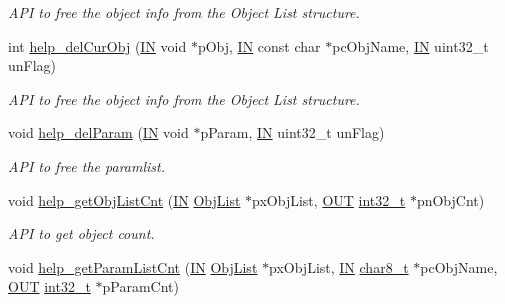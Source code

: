 \begin{DoxyCompactItemize}
\begin{DoxyCompactList}\small\item\em A\-P\-I to free the object info from the Object List structure. \end{DoxyCompactList}\item 
int \hyperlink{group__LIBHELP_ga44eabeb9342dfc93a4f4de134d43e8ea}{help\-\_\-del\-Cur\-Obj} (\hyperlink{group__LIBHELP_gac2bbd6d630a06a980d9a92ddb9a49928}{I\-N} void $\ast$p\-Obj, \hyperlink{group__LIBHELP_gac2bbd6d630a06a980d9a92ddb9a49928}{I\-N} const char $\ast$pc\-Obj\-Name, \hyperlink{group__LIBHELP_gac2bbd6d630a06a980d9a92ddb9a49928}{I\-N} uint32\-\_\-t un\-Flag)
\begin{DoxyCompactList}\small\item\em A\-P\-I to free the object info from the Object List structure. \end{DoxyCompactList}\item 
void \hyperlink{group__LIBHELP_ga6e97d803078dec87657f1a4558206d14}{help\-\_\-del\-Param} (\hyperlink{group__LIBHELP_gac2bbd6d630a06a980d9a92ddb9a49928}{I\-N} void $\ast$p\-Param, \hyperlink{group__LIBHELP_gac2bbd6d630a06a980d9a92ddb9a49928}{I\-N} uint32\-\_\-t un\-Flag)
\begin{DoxyCompactList}\small\item\em A\-P\-I to free the paramlist. \end{DoxyCompactList}\item 
void \hyperlink{group__LIBHELP_gafd93b1fc0a079d3dda8a3b55ec333644}{help\-\_\-get\-Obj\-List\-Cnt} (\hyperlink{group__LIBHELP_gac2bbd6d630a06a980d9a92ddb9a49928}{I\-N} \hyperlink{structObjList}{Obj\-List} $\ast$px\-Obj\-List, \hyperlink{group__LIBHELP_gaec78e7a9e90a406a56f859ee456e8eae}{O\-U\-T} \hyperlink{commondefs_8h_a32f2e37ee053cf2ce8ca28d1f74630e5}{int32\-\_\-t} $\ast$pn\-Obj\-Cnt)
\begin{DoxyCompactList}\small\item\em A\-P\-I to get object count. \end{DoxyCompactList}\item 
void \hyperlink{group__LIBHELP_ga0a5ee1490de2047bd9b7fbb32c8ef583}{help\-\_\-get\-Param\-List\-Cnt} (\hyperlink{group__LIBHELP_gac2bbd6d630a06a980d9a92ddb9a49928}{I\-N} \hyperlink{structObjList}{Obj\-List} $\ast$px\-Obj\-List, \hyperlink{group__LIBHELP_gac2bbd6d630a06a980d9a92ddb9a49928}{I\-N} \hyperlink{group__LIBHELP_ga054e39e306fb3948d07aadf394da2fbf}{char8\-\_\-t} $\ast$pc\-Obj\-Name, \hyperlink{group__LIBHELP_gaec78e7a9e90a406a56f859ee456e8eae}{O\-U\-T} \hyperlink{commondefs_8h_a32f2e37ee053cf2ce8ca28d1f74630e5}{int32\-\_\-t} $\ast$p\-Param\-Cnt)

\end{DoxyCompactItemize}
